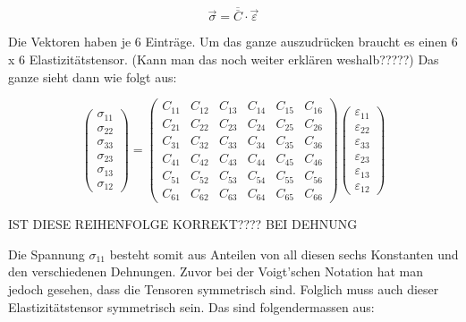 \[
\overrightarrow{\sigma}
=
\overline{\overline{C}}\cdot \overrightarrow{\varepsilon}
\]

Die Vektoren haben je 6 Einträge. Um das ganze auszudrücken braucht es einen 6 x 6 Elastizitätstensor. (Kann man das noch weiter erklären weshalb?????)
Das ganze sieht dann wie folgt aus:

\[
\begin{pmatrix}
	\sigma_{11} \\
	\sigma_{22} \\
	\sigma_{33} \\
	\sigma_{23} \\
	\sigma_{13} \\
	\sigma_{12}
\end{pmatrix}
=
\begin{pmatrix}
	C_{11} & C_{12} & C_{13} & C_{14} & C_{15} & C_{16} \\
	C_{21} & C_{22} & C_{23} & C_{24} & C_{25} & C_{26} \\
	C_{31} & C_{32} & C_{33} & C_{34} & C_{35} & C_{36} \\
	C_{41} & C_{42} & C_{43} & C_{44} & C_{45} & C_{46} \\
	C_{51} & C_{52} & C_{53} & C_{54} & C_{55} & C_{56} \\
	C_{61} & C_{62} & C_{63} & C_{64} & C_{65} & C_{66}
\end{pmatrix}
\begin{pmatrix}
	\varepsilon_{11} \\
	\varepsilon_{22} \\
	\varepsilon_{33} \\
	\varepsilon_{23} \\
	\varepsilon_{13} \\
	\varepsilon_{12}
\end{pmatrix}
\]

IST DIESE REIHENFOLGE KORREKT???? BEI DEHNUNG

Die Spannung $\sigma_{11}$ besteht somit aus Anteilen von all diesen sechs Konstanten und den verschiedenen Dehnungen.
Zuvor bei der Voigt'schen Notation hat man jedoch gesehen, dass die Tensoren symmetrisch sind.
Folglich muss auch dieser Elastizitätstensor symmetrisch sein.
Das sind folgendermassen aus:

